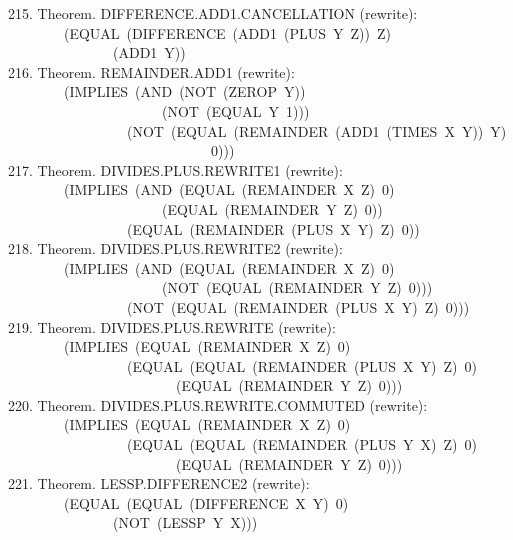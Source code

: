 \documentclass[10pt]{book}
\newenvironment{pubasis}{\begin{flushleft}}{\end{flushleft}}
\begin{document}
\begin{pubasis}
215.    Theorem.  DIFFERENCE.ADD1.CANCELLATION (rewrite):\\
~~~~~~~~(EQUAL~(DIFFERENCE~(ADD1~(PLUS~Y~Z))~Z)\\
~~~~~~~~~~~~~~~(ADD1~Y))\\

216.    Theorem.  REMAINDER.ADD1 (rewrite):\\
~~~~~~~~(IMPLIES~(AND~(NOT~(ZEROP~Y))\\
~~~~~~~~~~~~~~~~~~~~~~(NOT~(EQUAL~Y~1)))\\
~~~~~~~~~~~~~~~~~(NOT~(EQUAL~(REMAINDER~(ADD1~(TIMES~X~Y))~Y)\\
~~~~~~~~~~~~~~~~~~~~~~~~~~~~~0)))\\

217.    Theorem.  DIVIDES.PLUS.REWRITE1 (rewrite):\\
~~~~~~~~(IMPLIES~(AND~(EQUAL~(REMAINDER~X~Z)~0)\\
~~~~~~~~~~~~~~~~~~~~~~(EQUAL~(REMAINDER~Y~Z)~0))\\
~~~~~~~~~~~~~~~~~(EQUAL~(REMAINDER~(PLUS~X~Y)~Z)~0))\\

218.    Theorem.  DIVIDES.PLUS.REWRITE2 (rewrite):\\
~~~~~~~~(IMPLIES~(AND~(EQUAL~(REMAINDER~X~Z)~0)\\
~~~~~~~~~~~~~~~~~~~~~~(NOT~(EQUAL~(REMAINDER~Y~Z)~0)))\\
~~~~~~~~~~~~~~~~~(NOT~(EQUAL~(REMAINDER~(PLUS~X~Y)~Z)~0)))\\

219.    Theorem.  DIVIDES.PLUS.REWRITE (rewrite):\\
~~~~~~~~(IMPLIES~(EQUAL~(REMAINDER~X~Z)~0)\\
~~~~~~~~~~~~~~~~~(EQUAL~(EQUAL~(REMAINDER~(PLUS~X~Y)~Z)~0)\\
~~~~~~~~~~~~~~~~~~~~~~~~(EQUAL~(REMAINDER~Y~Z)~0)))\\

220.    Theorem.  DIVIDES.PLUS.REWRITE.COMMUTED (rewrite):\\
~~~~~~~~(IMPLIES~(EQUAL~(REMAINDER~X~Z)~0)\\
~~~~~~~~~~~~~~~~~(EQUAL~(EQUAL~(REMAINDER~(PLUS~Y~X)~Z)~0)\\
~~~~~~~~~~~~~~~~~~~~~~~~(EQUAL~(REMAINDER~Y~Z)~0)))\\

221.    Theorem.  LESSP.DIFFERENCE2 (rewrite):\\
~~~~~~~~(EQUAL~(EQUAL~(DIFFERENCE~X~Y)~0)\\
~~~~~~~~~~~~~~~(NOT~(LESSP~Y~X)))\\


\end{pubasis}
\end{document}
